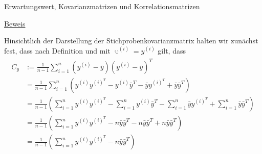 \documentclass[
  8pt,
  ignorenonframetext,
]{beamer}
\DeclareMathOperator*{\ups}{\upsilon}
\begin{document}
\begin{frame}{Erwartungswert, Kovarianzmatrizen und
Korrelationsmatrizen}
\protect\hypertarget{erwartungswert-kovarianzmatrizen-und-korrelationsmatrizen-9}{}
\footnotesize

\underline{Beweis} \vspace{1mm}

Hinsichtlich der Darstellung der Stichprobenkovarianzmatrix halten wir
zunächst fest, dass nach Definition und mit \({\ups}^{(i)} = y^{(i)}\)
gilt, dass \begin{align}
\begin{split}
C_y  
& := \frac{1}{n-1}\sum_{i=1}^n (y^{(i)} - \bar{y})(y^{(i)} - \bar{y})^T \\
&  = \frac{1}{n-1}\sum_{i=1}^n \left(y^{(i)}y^{{(i)}^T} - y^{(i)}\bar{y}^T - \bar{y}y^{{(i)}^T} + \bar{y}\bar{y}^T\right) \\
&  = \frac{1}{n-1}\left(\sum_{i=1}^n y^{(i)}y^{{(i)}^T} - \sum_{i=1}^n y^{(i)}\bar{y}^T - \sum_{i=1}^n \bar{y}y^{{(i)}^T} + \sum_{i=1}^n \bar{y}\bar{y}^T\right) \\
&  = \frac{1}{n-1}\left(\sum_{i=1}^n y^{(i)}y^{{(i)}^T} - n\bar{y}\bar{y}^T - n\bar{y}\bar{y}^T + n\bar{y}\bar{y}^T\right) \\
&  = \frac{1}{n-1}\left(\sum_{i=1}^n y^{(i)}y^{{(i)}^T} - n\bar{y}\bar{y}^T\right) \\
\end{split}
\end{align}
\end{frame}
\end{document}

